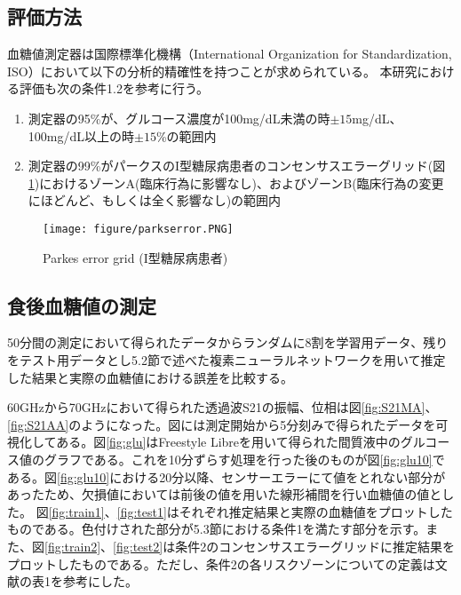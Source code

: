 \documentclass[11pt,a4paper,uplatex,draft]{ujarticle}
\begin{document}
\subsection{評価方法}
血糖値測定器は国際標準化機構（International Organization for Standardization, ISO）において以下の分析的精確性を持つことが求められている。	本研究における評価も次の条件1.2を参考に行う。

\begin{enumerate}
  \item 測定器の95\%が、グルコース濃度が100mg/dL未満の時$\pm 15$mg/dL、100mg/dL以上の時$\pm 15$\%の範囲内
  \item 測定器の99\%がパークスのI型糖尿病患者のコンセンサスエラーグリッド(図\ref{fig:parks})におけるゾーンA(臨床行為に影響なし)、およびゾーンB(臨床行為の変更にほどんど、もしくは全く影響なし)の範囲内
\end{enumerate}

\begin{figure}[hbtp]
	\centering
	\texttt{[image: figure/parkserror.PNG]}
	\caption{Parkes error grid (I型糖尿病患者)\cite{parkes}}
	\label{fig:parks}
\end{figure}

\newpage
\subsection{食後血糖値の測定}
50分間の測定において得られたデータからランダムに8割を学習用データ、残りをテスト用データとし5.2節で述べた複素ニューラルネットワークを用いて推定した結果と実際の血糖値における誤差を比較する。

60GHzから70GHzにおいて得られた透過波S21の振幅、位相は図\ref{fig:S21MA}、\ref{fig:S21AA}のようになった。図には測定開始から5分刻みで得られたデータを可視化してある。図\ref{fig:glu}はFreestyle Libreを用いて得られた間質液中のグルコース値のグラフである。これを10分ずらす処理を行った後のものが図\ref{fig:glu10}である。図\ref{fig:glu10}における20分以降、センサーエラーにて値をとれない部分があったため、欠損値においては前後の値を用いた線形補間を行い血糖値の値とした。
図\ref{fig:train1}、\ref{fig:test1}はそれぞれ推定結果と実際の血糖値をプロットしたものである。色付けされた部分が5.3節における条件1を満たす部分を示す。また、図\ref{fig:train2}、\ref{fig:test2}は条件2のコンセンサスエラーグリッドに推定結果をプロットしたものである。ただし、条件2の各リスクゾーンについての定義は文献\cite{parkes area}の表1を参考にした。
\end{document}
